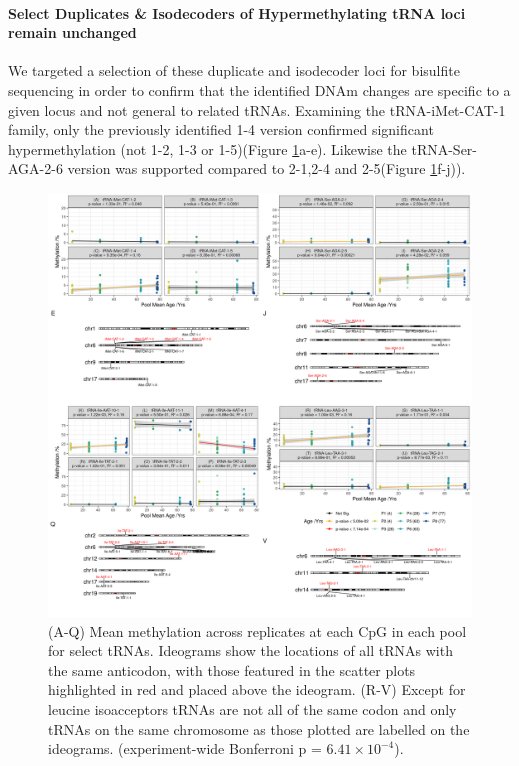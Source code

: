 \documentclass[]{book}
\let\oldparagraph\paragraph
\renewcommand{\paragraph}[1]{\oldparagraph{#1}\mbox{}}
\begin{document}
\hypertarget{select-duplicates-isodecoders-of-hypermethylating-trna-loci-remain-unchanged}{%
\paragraph{Select Duplicates \& Isodecoders of Hypermethylating tRNA loci remain unchanged}\label{select-duplicates-isodecoders-of-hypermethylating-trna-loci-remain-unchanged}}

We targeted a selection of these duplicate and isodecoder loci for bisulfite sequencing in order to confirm that the identified DNAm changes are specific to a given locus and not general to related tRNAs.
Examining the tRNA-iMet-CAT-1 family, only the previously identified 1-4 version confirmed significant hypermethylation (not 1-2, 1-3 or 1-5)(Figure \ref{fig:combinedKaryoplots}a-e). Likewise the tRNA-Ser-AGA-2-6 version was supported compared to 2-1,2-4 and 2-5(Figure \ref{fig:combinedKaryoplots}f-j)).

\begin{figure}

{\centering \includegraphics[width=1\linewidth]{./figs/combinedKaryoplots_sig_bl} 

}

\caption{(A-Q) Mean methylation across replicates at each CpG in each pool for select tRNAs. Ideograms show the locations of all tRNAs with the same anticodon, with those featured in the scatter plots highlighted in red and placed above the ideogram. (R-V) Except for leucine isoacceptors tRNAs are not all of the same codon and only tRNAs on the same chromosome as those plotted are labelled on the ideograms. (experiment-wide Bonferroni p = \(6.41\times10^{-4}\)).}\label{fig:combinedKaryoplots}
\end{figure}
\end{document}
